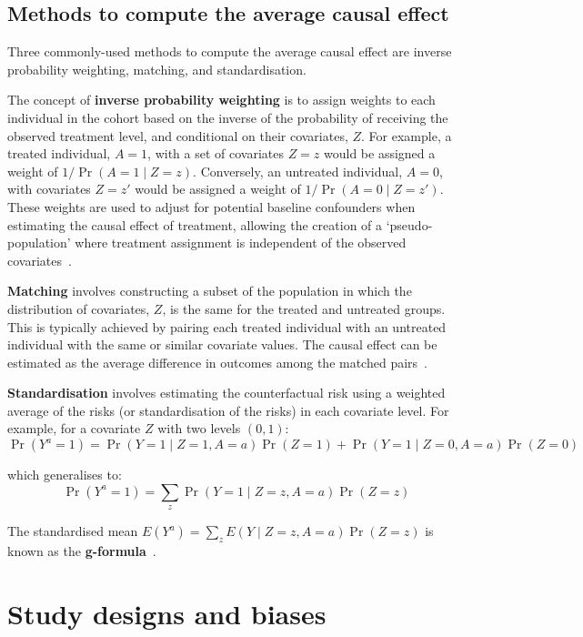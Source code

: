 \subsection{Methods to compute the average causal effect}

Three commonly-used methods to compute the average causal effect are inverse probability weighting, matching, and standardisation.

The concept of \textbf{inverse probability weighting} is to assign weights to each individual in the cohort based on the inverse of the probability of receiving the observed treatment level, and conditional on their covariates, $Z$. For example, a treated individual, $A = 1$, with a set of covariates $Z = z$ would be assigned a weight of $1/\Pr(A = 1 \mid Z = z)$. Conversely, an untreated individual, $A = 0$, with covariates $Z = z'$ would be assigned a weight of $1/\Pr(A = 0 \mid Z = z')$. These weights are used to adjust for potential baseline confounders when estimating the causal effect of treatment, allowing the creation of a `pseudo-population' where treatment assignment is independent of the observed covariates~\parencite{Hernan2016-be}.

\textbf{Matching} involves constructing a subset of the population in which the distribution of covariates, $Z$, is the same for the treated and untreated groups. This is typically achieved by pairing each treated individual with an untreated individual with the same or similar covariate values. The causal effect can be estimated as the average difference in outcomes among the matched pairs~\parencite{Hernan2023-de}.

\textbf{Standardisation} involves estimating the counterfactual risk using a weighted average of the risks (or standardisation of the risks) in each covariate level. For example, for a covariate $Z$ with two levels $(0,1)$:
%
\[
    \Pr(Y^a = 1) = \Pr(Y = 1 \mid Z = 1, A = a)\Pr(Z = 1) + \Pr(Y = 1 \mid Z = 0, A = a)\Pr(Z = 0)
\]

which generalises to:
%
\[
    \Pr(Y^a = 1) = \sum_z{\Pr(Y = 1 \mid Z = z, A = a)\Pr(Z = z)}
\]

The standardised mean $E(Y^a) = \sum_z{E(Y \mid Z = z, A = a)\Pr(Z = z)}$ is known as the \textbf{g-formula}~\parencite{Hernan2016-be, Naimi2017-hd}.

\section{Study designs and biases}

